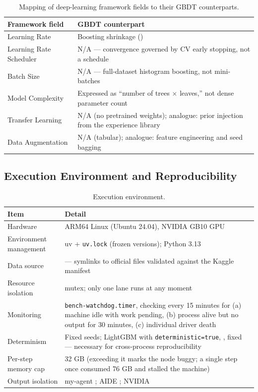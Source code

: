 \documentclass[11pt,a4paper]{article}
\begin{document}
\begin{table}[H]
\centering\small
\caption{Mapping of deep-learning framework fields to their GBDT counterparts.}
\label{tab:dlgbdt}
\begin{tabular}{@{}L{4.6cm}L{9.8cm}@{}}
\toprule
\textbf{Framework field} & \textbf{GBDT counterpart} \\
\midrule
Learning Rate & Boosting shrinkage () \\
Learning Rate Scheduler & N/A --- convergence governed by CV early stopping, not a schedule \\
Batch Size & N/A --- full-dataset histogram boosting, not mini-batches \\
Model Complexity & Expressed as ``number of trees $\times$ leaves,'' not dense parameter count \\
Transfer Learning & N/A (no pretrained weights); analogue: prior injection from the experience library \\
Data Augmentation & N/A (tabular); analogue: feature engineering and seed bagging \\
\bottomrule
\end{tabular}
\end{table}

\subsection{Execution Environment and Reproducibility}

\begin{table}[H]
\centering\small
\caption{Execution environment.}
\label{tab:env}
\begin{tabular}{@{}L{3.6cm}L{10.8cm}@{}}
\toprule
\textbf{Item} & \textbf{Detail} \\
\midrule
Hardware & ARM64 Linux (Ubuntu 24.04), NVIDIA GB10 GPU \\
Environment management & uv + \texttt{uv.lock} (frozen versions); Python 3.13 \\
Data source &  --- symlinks to official files validated against the Kaggle manifest \\
Resource isolation &  mutex; only one lane runs at any moment \\
Monitoring & \texttt{bench-watchdog.timer}, checking every 15 minutes for (a) machine idle with work pending, (b) process alive but no output for 30 minutes, (c) individual driver death \\
Determinism & Fixed seeds; LightGBM with \texttt{deterministic=true}, , fixed  --- necessary for cross-process reproducibility \\
Per-step memory cap & 32 GB (exceeding it marks the node buggy; a single step once consumed 76 GB and stalled the machine) \\
Output isolation & my-agent ; AIDE ; NVIDIA  \\
\bottomrule
\end{tabular}
\end{table}
\end{document}

